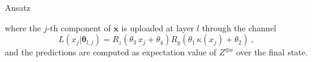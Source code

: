 \documentclass[20pt, final]{beamer}
\newlength{\colwidth}
\begin{document}
\begin{frame}[t]
\begin{columns}[t]
\begin{column}{\colwidth}
\begin{alertblock}{Ansatz}
\begin{figure} 
\label{fig:qpdf}
\end{figure}
where the $j$-th component of $\bm{x}$ is uploaded at layer $l$ through the channel
\begin{equation}
L(x_j| \bm{\theta}_{l,j}) = R_z(\theta_3\,x_j + \theta_4) R_y(\theta_1\, \kappa(x_j) + \theta_2) \ ,
\label{eq:uploading_layer}
\end{equation}
and the predictions are computed as expectation value of $Z^{\otimes n}$ over
the final state.
\end{alertblock}


\end{column}
\end{columns}
\end{frame}
\end{document}
